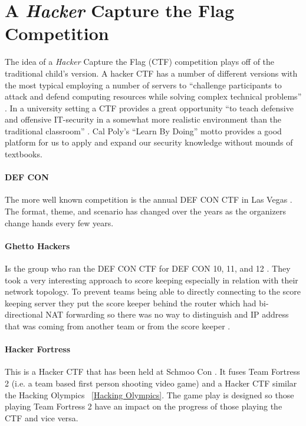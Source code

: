 \documentclass[10pt]{article}
\begin{document}
\section{A \textit{Hacker} Capture the Flag Competition}
The idea of a \textit{Hacker} Capture the Flag (CTF) competition plays off of
the traditional child's version. A hacker CTF has a number of different versions
with the most typical employing a number of servers to ``challenge participants
to attack and defend computing resources while solving complex technical
problems'' \cite{HackingCompetitionsForSecurityEducation}. In a university
setting a CTF provides a great opportunity ``to teach defensive and offensive
IT-security in a somewhat more realistic environment than the traditional
classroom'' \cite{HostingHackingChallenge}. Cal Poly's ``Learn By Doing'' motto
provides a good platform for us to apply and expand our security knowledge
without mounds of textbooks.

\paragraph*{DEF CON} The more well known competition is the annual DEF CON CTF
in Las Vegas \cite{DEFCONCTF}. The format, theme, and scenario has changed over
the years as the organizers change hands every few years.

\paragraph*{Ghetto Hackers} Is the group who ran the DEF CON CTF for DEF CON 10, 11, and 12
\cite{BlackHat2004}. They took a very interesting approach to score keeping especially in 
relation with their network topology. To prevent teams being able to directly connecting to 
the score keeping server they  put the score keeper behind the router which had bi-directional
 NAT forwarding so there was no way to distinguish and IP address that was coming from another
 team or from the score keeper \cite{BlackHat2004}.

\paragraph*{Hacker Fortress} This is a Hacker CTF that has been held at Schmoo Con 
\cite{HackerFortress}. It fuses Team Fortress 2 (i.e. a team based first person shooting
video game) and a Hacker CTF similar the Hacking Olympics ~\ref{Hacking Olympics}. 
The game play is designed so those playing Team Fortress 2 have an impact on the progress of
 those playing the CTF and vice versa.
\end{document}
